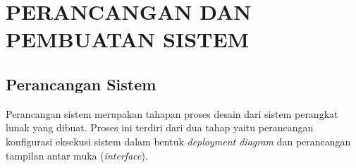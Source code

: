 



\section{\uppercase{PERANCANGAN DAN PEMBUATAN SISTEM}}

\subsection{Perancangan Sistem}
\par Perancangan sistem merupakan tahapan proses desain dari sistem perangkat lunak yang dibuat. Proses ini terdiri dari dua tahap yaitu perancangan konfigurasi eksekusi sistem dalam bentuk \textit{deployment diagram} dan perancangan tampilan antar muka (\textit{interface}).


